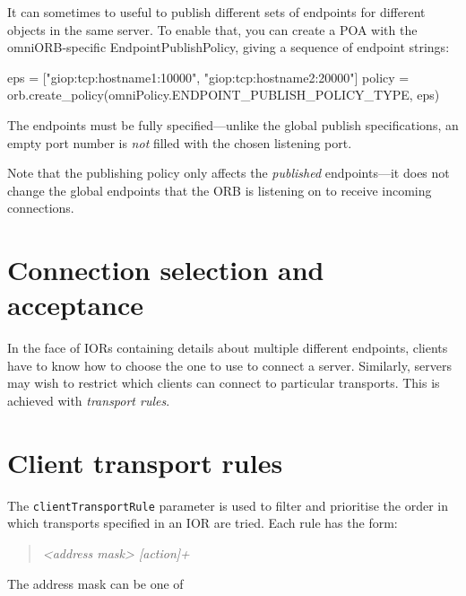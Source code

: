 \documentclass[11pt,oneside,a4paper]{book}
\newcommand{\code}[1]{\texttt{#1}}
\newcommand{\term}[1]{\textit{#1}}
\begin{document}
It can sometimes to useful to publish different sets of endpoints for
different objects in the same server. To enable that, you can create a
POA with the omniORB-specific EndpointPublishPolicy, giving a sequence
of endpoint strings:

\begin{cxxlisting}
eps = ["giop:tcp:hostname1:10000",
       "giop:tcp:hostname2:20000"]
policy = orb.create_policy(omniPolicy.ENDPOINT_PUBLISH_POLICY_TYPE, eps)
\end{cxxlisting}

\noindent The endpoints must be fully specified---unlike the global
publish specifications, an empty port number is \emph{not} filled with
the chosen listening port.

Note that the publishing policy only affects the \emph{published}
endpoints---it does not change the global endpoints that the ORB is
listening on to receive incoming connections.


\section{Connection selection and acceptance}

In the face of IORs containing details about multiple different
endpoints, clients have to know how to choose the one to use to
connect a server. Similarly, servers may wish to restrict which
clients can connect to particular transports. This is achieved with
\term{transport rules}.


\section{Client transport rules}
\label{sec:clientRule}

The \code{clientTransportRule} parameter is used to filter and
prioritise the order in which transports specified in an IOR are
tried. Each rule has the form:

\begin{quote}
\textit{<address mask> [action]+}
\end{quote}

\noindent The address mask can be one of

\vspace{\baselineskip}
\end{document}
